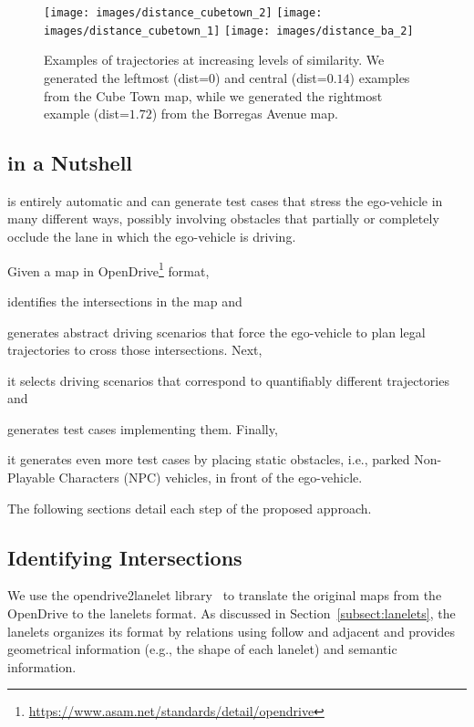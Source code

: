 \documentclass[conference]{IEEEtran}
\begin{document}
\begin{figure}[t]
\texttt{[image: images/distance\_cubetown\_2]}
\endminipage\hfill
{}
\texttt{[image: images/distance\_cubetown\_1]}
\endminipage\hfill
{}%
  \texttt{[image: images/distance\_ba\_2]}
\endminipage
\caption{Examples of trajectories at increasing levels of similarity. We generated the leftmost (dist=$0$) and central (dist=$0.14$) examples from the Cube Town map, while we generated the rightmost example (dist=$1.72$) from the Borregas Avenue map.}
\label{fig:similarity}
\end{figure}


\subsection{\tool in a Nutshell}
\tool is entirely automatic and can generate test cases that stress the ego-vehicle in many different ways, possibly involving obstacles that partially or completely occlude the lane in which the ego-vehicle is driving. 

Given a map in OpenDrive\footnote{\href{https://www.asam.net/standards/detail/opendrive/}{https://www.asam.net/standards/detail/opendrive}}  format, \tool 
\begin{inparaenum}[(1)]
\item identifies the intersections in the map and 
\item generates abstract driving scenarios that force the ego-vehicle to plan legal trajectories to cross those intersections. Next, \item it selects driving scenarios that correspond to quantifiably different trajectories and
\item generates test cases implementing them. 
Finally, \item it generates even more test cases by placing static obstacles, i.e., parked Non-Playable Characters (NPC) vehicles, in front of the ego-vehicle.
\end{inparaenum}

The following sections detail each step of the proposed approach.

\subsection{Identifying Intersections}
We use the opendrive2lanelet library~\cite{althoff2018automatic} to translate the original maps from the OpenDrive to the lanelets format. As discussed in Section~\ref{subsect:lanelets}, the lanelets organizes its format by relations using follow and adjacent and provides geometrical information (e.g., the shape of each lanelet) and semantic information. 
\end{document}
